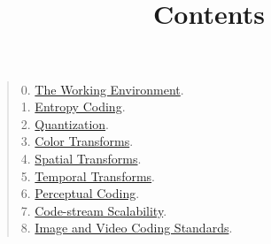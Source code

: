 

\title{\SM{}\\Contents}

\maketitle


\begin{quote}
0. \href{https://sistemas-multimedia.github.io/contents/working_environment}{The Working Environment}.\\
1. \href{https://sistemas-multimedia.github.io/contents/entropy_coding}{Entropy Coding}. \\
2. \href{https://sistemas-multimedia.github.io/contents/quantization}{Quantization}. \\
3. \href{https://sistemas-multimedia.github.io/contents/color_transforms/}{Color Transforms}. \\
4. \href{https://sistemas-multimedia.github.io/contents/spatial_transforms}{Spatial Transforms}. \\
5. \href{https://sistemas-multimedia.github.io/contents/temporal_transforms}{Temporal Transforms}. \\
6. \href{https://sistemas-multimedia.github.io/contents/perceptual_coding}{Perceptual Coding}. \\
7. \href{https://sistemas-multimedia.github.io/contents/data_scalability}{Code-stream Scalability}. \\
8. \href{https://sistemas-multimedia.github.io/contents/standards}{Image and Video Coding Standards}.  %
\end{quote}


%



